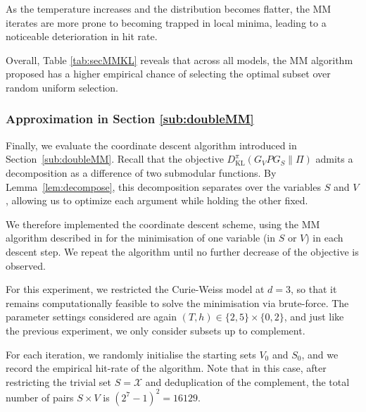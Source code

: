 \documentclass[EJP]{ejpecp} %
\begin{document}
As the temperature increases and the distribution becomes flatter, the MM iterates are more prone to becoming trapped in local minima, leading to a noticeable deterioration in hit rate.

Overall, Table \ref{tab:secMMKL} reveals that across all models, the MM algorithm proposed has a higher empirical chance of selecting the optimal subset over random uniform selection. 

\subsubsection{Approximation in Section \ref{sub:doubleMM}}
Finally, we evaluate the coordinate descent algorithm introduced in Section~\ref{sub:doubleMM}. Recall that the objective $D^\pi_{\mathrm{KL}}(G_V P G_S \| \Pi)$ admits a decomposition as a difference of two submodular functions. By Lemma~\ref{lem:decompose}, this decomposition separates over the variables $S$ and $V$, allowing us to optimize each argument while holding the other fixed.

We therefore implemented the coordinate descent scheme, using the MM algorithm described in \cite{iyer2013algorithmsapproximateminimizationdifference} for the minimisation of one variable (in $S$ or $V$) in each descent step. We repeat the algorithm until no further decrease of the objective is observed. 

For this experiment, we restricted the Curie-Weiss model at $d = 3$, so that it remains computationally feasible to solve the minimisation via brute-force. The parameter settings considered are again $(T,h) \in \{2,5\} \times \{0,2\}$, and just like the previous experiment, we only consider subsets up to complement. 

For each iteration, we randomly initialise the starting sets $V_0$ and $S_0$, and we record the empirical hit-rate of the algorithm. Note that in this case, after restricting the trivial set $S = \mathcal{X}$ and deduplication of the complement, the total number of pairs $S \times V$ is $(2^7-1)^2 = 16129$.
\end{document}
